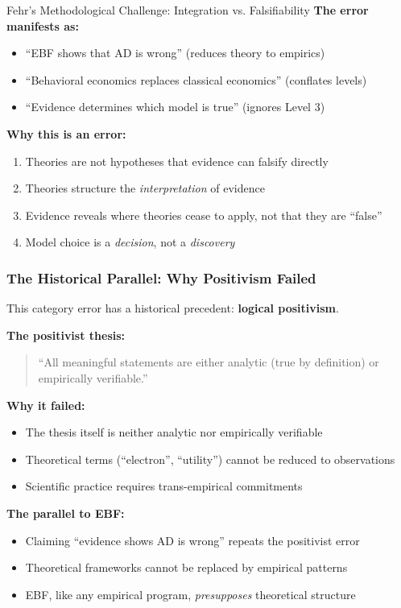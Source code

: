 \begin{chapter}{Fehr's Methodological Challenge: Integration vs. Falsifiability}
\textbf{The error manifests as:}
\begin{itemize}[noitemsep]
    \item ``EBF shows that AD is wrong'' (reduces theory to empirics)
    \item ``Behavioral economics replaces classical economics'' (conflates levels)
    \item ``Evidence determines which model is true'' (ignores Level 3)
\end{itemize}

\textbf{Why this is an error:}
\begin{enumerate}[noitemsep]
    \item Theories are not hypotheses that evidence can falsify directly
    \item Theories structure the \textit{interpretation} of evidence
    \item Evidence reveals where theories cease to apply, not that they are ``false''
    \item Model choice is a \textit{decision}, not a \textit{discovery}
\end{enumerate}

\subsubsection{The Historical Parallel: Why Positivism Failed}

This category error has a historical precedent: \textbf{logical positivism}.

\textbf{The positivist thesis:}
\begin{quote}
``All meaningful statements are either analytic (true by definition) or empirically verifiable.''
\end{quote}

\textbf{Why it failed:}
\begin{itemize}[noitemsep]
    \item The thesis itself is neither analytic nor empirically verifiable
    \item Theoretical terms (``electron'', ``utility'') cannot be reduced to observations
    \item Scientific practice requires trans-empirical commitments
\end{itemize}

\textbf{The parallel to EBF:}
\begin{itemize}[noitemsep]
    \item Claiming ``evidence shows AD is wrong'' repeats the positivist error
    \item Theoretical frameworks cannot be replaced by empirical patterns
    \item EBF, like any empirical program, \textit{presupposes} theoretical structure
\end{itemize}


\end{chapter}
